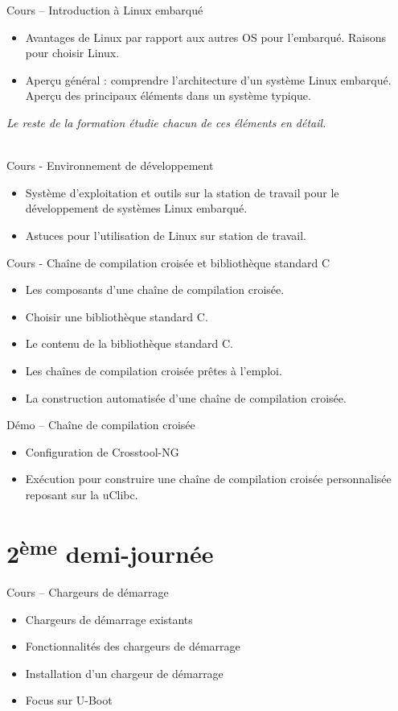 \documentclass[a4paper,12pt,obeyspaces,spaces,hyphens]{article}
\begin{document}
\feagendaonecolumn
{Cours – Introduction à Linux embarqué}
{
  \begin{itemize}
  \item Avantages de Linux par rapport aux autres OS pour l'embarqué.
	Raisons pour choisir Linux.
  \item Aperçu général : comprendre l'architecture d'un système Linux
	embarqué. Aperçu des principaux éléments dans un système typique.
  \end{itemize}
  {\em Le reste de la formation étudie chacun de ces éléments en détail.}
}
\\
\feagendatwocolumn
{Cours - Environnement de développement}
{
  \begin{itemize}
  \item Système d'exploitation et outils sur la station de travail
	pour le développement de systèmes Linux embarqué.
  \item Astuces pour l'utilisation de Linux sur station de travail.
  \end{itemize}
}
{Cours - Chaîne de compilation croisée et bibliothèque standard C}
{
  \begin{itemize}
  \item Les composants d'une chaîne de compilation croisée.
  \item Choisir une bibliothèque standard C.
  \item Le contenu de la bibliothèque standard C.
  \item Les chaînes de compilation croisée prêtes à l'emploi.
  \item La construction automatisée d'une chaîne de compilation croisée.
  \end{itemize}
}

\feagendaonecolumn
{Démo – Chaîne de compilation croisée}
{
  \begin{itemize}
  \item Configuration de Crosstool-NG
  \item Exécution pour construire une chaîne de compilation croisée
	personnalisée reposant sur la uClibc.
  \end{itemize}
}

\section{2\textsuperscript{ème} demi-journée}


\feagendaonecolumn
{Cours – Chargeurs de démarrage}
{
  \begin{itemize}
  \item Chargeurs de démarrage existants
  \item Fonctionnalités des chargeurs de démarrage
  \item Installation d'un chargeur de démarrage
  \item Focus sur U-Boot
  \end{itemize}
}
\\
\end{document}
